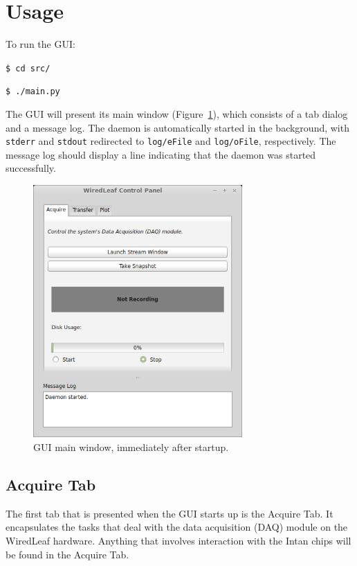 
\section{Usage}
\label{sec_usage}

To run the GUI:

\vspace{5mm}
\texttt{\$ cd src/}

\texttt{\$ ./main.py}
\vspace{5mm}

\noindent
The GUI will present its main window (Figure~\ref{fig_mainwindow}), which consists of a tab dialog and a message log. The daemon is automatically started in the background, with \texttt{stderr} and \texttt{stdout} redirected to \texttt{log/eFile} and \texttt{log/oFile}, respectively. The message log should display a line indicating that the daemon was started successfully.

\begin{figure}[h!]
\begin{center}
\includegraphics[width=8cm]{screenshots/mainwindow.png}
\end{center}
\caption{GUI main window, immediately after startup.}
\label{fig_mainwindow}
\end{figure}

\subsection{Acquire Tab}
\label{sec_usage_acquire}

The first tab that is presented when the GUI starts up is the Acquire Tab. It encapsulates the tasks that deal with the data acquisition (DAQ) module on the WiredLeaf hardware. Anything that involves interaction with the Intan chips will be found in the Acquire Tab.

